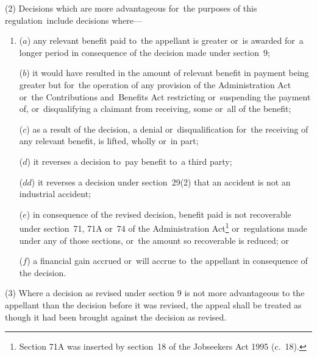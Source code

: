 \documentclass[12pt,a4paper]{article}
\begin{document}
(2) Decisions which are more advantageous for~the purposes of this regulation~include decisions where—
\begin{enumerate}\item[]
($a$) any relevant benefit paid to~the appellant is greater or~is awarded for~a longer period in consequence of the decision made under section~9;

($b$) it would have resulted in the amount of relevant benefit in payment being greater but for~the operation of any provision of the Administration Act or~the Contributions and~Benefits Act restricting or~suspending the payment of, or~disqualifying a claimant from receiving, some or~all of the benefit;

($c$) as a result of the decision, a denial or~disqualification for~the receiving of any relevant benefit, is lifted, wholly or~in part;

($d$) it reverses a decision to~pay benefit to~a third party;

($dd$) it reverses a decision under section~29(2) that an accident is not an industrial accident;

($e$) in consequence of the revised decision, benefit paid is not recoverable under section~71, 71A or~74 of the Administration Act\footnote{\frenchspacing Section 71A was inserted by section~18 of the Jobseekers Act 1995 (c.~18).} or~regulations made under any of those sections, or~the amount so recoverable is reduced; or

($f$) a financial gain accrued or~will accrue to~the appellant in consequence of the decision.
\end{enumerate}


(3) Where a decision as revised under section 9 is not more advantageous to the appellant than the decision before it was revised, the appeal shall be treated as though it had been brought against the decision as revised.
\end{document}
